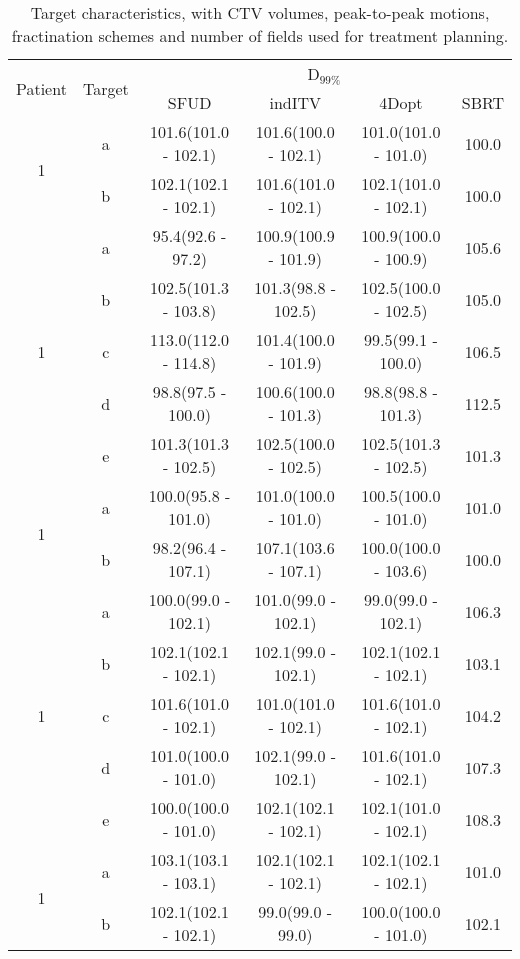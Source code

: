 \begin{table}[H]
	\centering
	\caption{Target characteristics, with CTV volumes, peak-to-peak motions, fractination schemes and number of fields used for treatment planning.}
	\begin{tabular}{c|c|c|c|c|c}
		\hline\hline
		\multirow{2}{*}{Patient} & \multirow{2}{*}{Target} & \multicolumn{4}{|c}{D$_{99\%}$} \\
		 & & SFUD & indITV & 4Dopt & SBRT \\
		\hline

\multirow{2}{*}{1} & a & 101.6(101.0 - 102.1) & 101.6(100.0 - 102.1) & 101.0(101.0 - 101.0) & 100.0\\ 
 & b & 102.1(102.1 - 102.1) & 101.6(101.0 - 102.1) & 102.1(101.0 - 102.1) & 100.0\\ 
\hline

\multirow{5}{*}{1} & a & 95.4(92.6 - 97.2) & 100.9(100.9 - 101.9) & 100.9(100.0 - 100.9) & 105.6\\ 
 & b & 102.5(101.3 - 103.8) & 101.3(98.8 - 102.5) & 102.5(100.0 - 102.5) & 105.0\\ 
 & c & 113.0(112.0 - 114.8) & 101.4(100.0 - 101.9) & 99.5(99.1 - 100.0) & 106.5\\ 
 & d & 98.8(97.5 - 100.0) & 100.6(100.0 - 101.3) & 98.8(98.8 - 101.3) & 112.5\\ 
 & e & 101.3(101.3 - 102.5) & 102.5(100.0 - 102.5) & 102.5(101.3 - 102.5) & 101.3\\ 
\hline

\multirow{2}{*}{1} & a & 100.0(95.8 - 101.0) & 101.0(100.0 - 101.0) & 100.5(100.0 - 101.0) & 101.0\\ 
 & b & 98.2(96.4 - 107.1) & 107.1(103.6 - 107.1) & 100.0(100.0 - 103.6) & 100.0\\ 
\hline

\multirow{5}{*}{1} & a & 100.0(99.0 - 102.1) & 101.0(99.0 - 102.1) & 99.0(99.0 - 102.1) & 106.3\\ 
 & b & 102.1(102.1 - 102.1) & 102.1(99.0 - 102.1) & 102.1(102.1 - 102.1) & 103.1\\ 
 & c & 101.6(101.0 - 102.1) & 101.0(101.0 - 102.1) & 101.6(101.0 - 102.1) & 104.2\\ 
 & d & 101.0(100.0 - 101.0) & 102.1(99.0 - 102.1) & 101.6(101.0 - 102.1) & 107.3\\ 
 & e & 100.0(100.0 - 101.0) & 102.1(102.1 - 102.1) & 102.1(101.0 - 102.1) & 108.3\\ 
\hline

\multirow{2}{*}{1} & a & 103.1(103.1 - 103.1) & 102.1(102.1 - 102.1) & 102.1(102.1 - 102.1) & 101.0\\ 
 & b & 102.1(102.1 - 102.1) & 99.0(99.0 - 99.0) & 100.0(100.0 - 101.0) & 102.1\\ 
\hline


\end{tabular}
\end{table}
